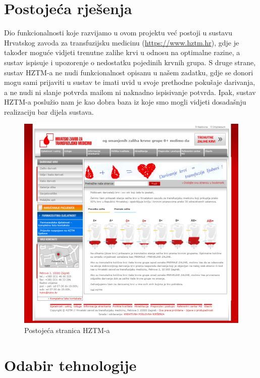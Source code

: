         \section{Postojeća rješenja}
        
        \par {Dio funkcionalnosti koje razvijamo u ovom projektu već postoji u sustavu Hrvatskog zavoda za transfuzijsku medicinu (\url{https://www.hztm.hr}), gdje je također moguće vidjeti trenutne zalihe krvi u odnosu na optimalne razine, a sustav ispisuje i upozorenje o nedostatku pojedinih krvnih grupa. S druge strane, sustav HZTM-a ne nudi funkcionalnost opisanu u našem zadatku, gdje se donori mogu sami prijaviti u sustav te imati uvid u svoje prethodne pokušaje darivanja, a ne nudi ni slanje potvrda mailom ni naknadno ispisivanje potvrda. Ipak, sustav HZTM-a poslužio nam je kao dobra baza iz koje smo mogli vidjeti dosadašnju realizaciju bar dijela sustava.\\}
        
        
        \begin{figure}[H]
			\includegraphics[scale=0.6]{slike/hztm-stranica.PNG}
			\centering
			\caption{Postojeća stranica HZTM-a}
			\label{fig:hztm-stranica}
		\end{figure}
        
        \section{Odabir tehnologije}
        

